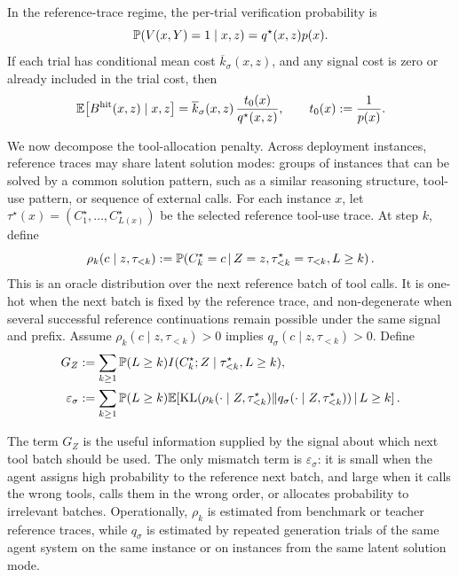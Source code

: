 \begin{proposition}
\label{prop:tool-first-passage}
In the reference-trace regime, the per-trial verification probability is
\[
\mathbb{P}(V(x,Y)=1\mid x,z)
=
q^\star(x,z)p(x).
\]
If each trial has conditional mean cost \(\overline k_\sigma(x,z)\), and any signal cost
is zero or already included in the trial cost, then
\begin{equation}
\mathbb{E}\!\left[B^{\mathrm{hit}}(x,z)\mid x,z\right]
=
\overline k_\sigma(x,z)\,
\frac{t_0(x)}{q^\star(x,z)},
\qquad
t_0(x):=\frac{1}{p(x)}.
\label{eq:tool-first-passage}
\end{equation}
\end{proposition}

We now decompose the tool-allocation penalty. Across deployment instances,
reference traces may share latent solution modes: groups of instances that can
be solved by a common solution pattern, such as a similar reasoning structure,
tool-use pattern, or sequence of external calls. For each instance \(x\), let
\(\tau^\star(x)=(C_1^\star,\ldots,C_{L(x)}^\star)\) be the selected reference
tool-use trace. At step \(k\), define
\begin{equation}
\rho_k(c\mid z,\tau_{<k})
:=
\mathbb{P}\!\left(
C_k^\star=c
\,\middle|\,
Z=z,\tau^\star_{<k}=\tau_{<k},L\ge k
\right).
\label{eq:reference-batch-posterior}
\end{equation}
This is an oracle distribution over the next reference batch of tool calls. It
is one-hot when the next batch is fixed by the reference trace, and
non-degenerate when several successful reference continuations remain possible
under the same signal and prefix. Assume
\(\rho_k(c\mid z,\tau_{<k})>0\) implies
\(q_\sigma(c\mid z,\tau_{<k})>0\). Define
\begin{align}
G_Z
&:=\sum_{k\ge1}\mathbb{P}(L\ge k)
I(C_k^\star;Z\mid \tau_{<k}^\star,L\ge k),\nonumber\\
\varepsilon_\sigma
&:=\sum_{k\ge1}\mathbb{P}(L\ge k)
\mathbb{E}\!\left[
\operatorname{KL}\!\left(
\rho_k(\cdot\mid Z,\tau_{<k}^\star)
\Vert
q_\sigma(\cdot\mid Z,\tau_{<k}^\star)
\right)
\,\middle|\,L\ge k\right].
\label{eq:batched-tool-mismatch}
\end{align}

The term \(G_Z\) is the useful information supplied by the signal about which
next tool batch should be used. The only mismatch term is \(\varepsilon_\sigma\):
it is small when the agent assigns high probability to the reference next batch,
and large when it calls the wrong tools, calls them in the wrong order, or
allocates probability to irrelevant batches. Operationally, \(\rho_k\) is
estimated from benchmark or teacher reference traces, while \(q_\sigma\) is
estimated by repeated generation trials of the same agent system on the same
instance or on instances from the same latent solution mode.

